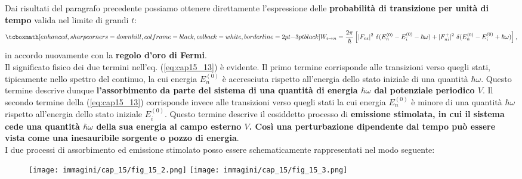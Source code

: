 \documentclass[a4paper,12pt,oneside]{book}
\begin{document}
Dai risultati del paragrafo precedente possiamo ottenere direttamente l'espressione delle \textbf{probabilità di transizione per unità di tempo} valida nel limite di grandi $t$:
	\begin{align}
		\tcboxmath[enhanced, sharp corners=downhill, colframe=black, colback=white, borderline={2pt}{-3pt}{black}]{
			W_{i\rightarrow n} = \frac{2\pi}{\hbar}\left[ \vert F_{ni}\vert ^2 \ \delta (E_n^{(0)}-E_i^{(0)}-\hbar \omega) + \vert F_{ni} ^+\vert ^2 \ \delta (E_n^{(0)}-E_i^{(0)}+\hbar \omega)\right],
			} \nonumber \\[-0.5cm]
			\,
	\label{eq:cap15_13}
	\end{align}
in accordo nuovamente con la \textbf{regolo d'oro di Fermi}.\\

Il significato fisico dei due termini nell'eq. (\ref{eq:cap15_13}) è evidente. Il primo termine corrisponde alle transizioni verso quegli stati, tipicamente nello spettro del continuo, la cui energia $E_n ^{(0)}$ è accresciuta rispetto all'energia dello stato iniziale di una quantità $\hbar \omega$. Questo termine descrive dunque \textbf{l'assorbimento da parte del sistema di una quantità di energia $\hbar \omega$ dal potenziale periodico $V$}. Il secondo termine della (\ref{eq:cap15_13}) corrisponde invece alle transizioni verso quegli stati la cui energia $E_n ^{(0)}$ è minore di una quantità $\hbar \omega$ rispetto all'energia dello stato iniziale $E_i ^{(0)}$. Questo termine descrive il cosiddetto processo di \textbf{emissione stimolata, in cui il sistema cede una quantità $\hbar \omega$ della sua energia al campo esterno $V$. Così una perturbazione dipendente dal tempo può essere vista come una inesauribile sorgente o pozzo di energia}.\\
I due processi di assorbimento ed emissione stimolato posso essere schematicamente rappresentati nel modo seguente:
\begin{figure}[!htbp]
\begin{center}
\texttt{[image: immagini/cap\_15/fig\_15\_2.png]}\hspace{1cm}
\texttt{[image: immagini/cap\_15/fig\_15\_3.png]}
\end{center}
\end{figure}
\end{document}
